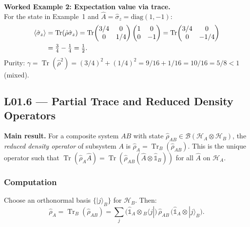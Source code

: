 \documentclass[11pt,a4paper]{article}
\begin{document}
\begin{tcolorbox}[goldbox]
\textbf{Worked Example 2: Expectation value via trace.}\\
For the state in Example~1 and $\hat{A}=\hat{\sigma}_z=\text{diag}(1,-1)$:
\begin{align}
\langle\hat{\sigma}_z\rangle
&=\operatorname{Tr}(\hat{\rho}\hat{\sigma}_z)
 =\operatorname{Tr}\!\begin{pmatrix}3/4&0\\0&1/4\end{pmatrix}\begin{pmatrix}1&0\\0&-1\end{pmatrix}
 =\operatorname{Tr}\!\begin{pmatrix}3/4&0\\0&-1/4\end{pmatrix}\notag\\
&=\tfrac{3}{4}-\tfrac{1}{4}=\tfrac{1}{2}.
\label{eq:L01.4}
\end{align}
Purity: $\gamma=\operatorname{Tr}(\hat{\rho}^2)=(3/4)^2+(1/4)^2=9/16+1/16=10/16=5/8<1$\quad (mixed).
\end{tcolorbox}

\subsection{L01.6 --- Partial Trace and Reduced Density Operators}
\label{sec:L01.3.4}

\begin{tcolorbox}[goldbox]
\textbf{Main result.}
For a composite system $AB$ with state $\hat{\rho}_{AB}\in\mathcal{B}(\mathcal{H}_A\otimes\mathcal{H}_B)$,
the \emph{reduced density operator} of subsystem $A$ is
$\hat{\rho}_A=\operatorname{Tr}_B(\hat{\rho}_{AB})$.
This is the unique operator such that
$\operatorname{Tr}(\hat{\rho}_A\hat{A})=\operatorname{Tr}(\hat{\rho}_{AB}(\hat{A}\otimes\hat{\mathbb{1}}_B))$
for all $\hat{A}$ on $\mathcal{H}_A$.
\end{tcolorbox}

\subsubsection*{Computation}

Choose an orthonormal basis $\{|j\rangle_B\}$ for $\mathcal{H}_B$.
Then:
\begin{equation}
\hat{\rho}_A=\operatorname{Tr}_B(\hat{\rho}_{AB})
=\sum_j\bigl(\hat{\mathbb{1}}_A\otimes{}_B\langle j|\bigr)\,
\hat{\rho}_{AB}\,
\bigl(\hat{\mathbb{1}}_A\otimes|j\rangle_B\bigr).
\label{eq:L01.5}
\end{equation}
\end{document}
